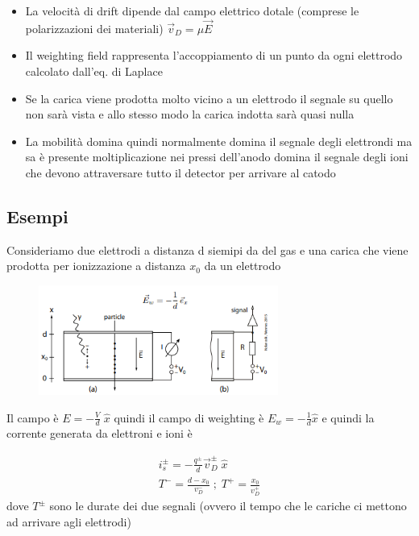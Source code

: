\begin{remark}
\begin{itemize}
    \item La velocità di drift dipende dal campo elettrico dotale (comprese le polarizzazioni dei materiali) $\vec{v}_D=\mu \vec{E}$
    \item Il weighting field rappresenta l'accoppiamento di un punto da ogni elettrodo calcolato dall'eq. di Laplace
    \item Se la carica viene prodotta molto vicino a un elettrodo il segnale su quello non sarà vista e allo stesso modo la carica indotta sarà quasi nulla
    \item La mobilità domina quindi normalmente domina il segnale degli elettrondi ma sa è presente moltiplicazione nei pressi dell'anodo domina il segnale degli ioni che devono attraversare tutto il detector per arrivare al catodo
\end{itemize}
\end{remark}

\subsection{Esempi}
Consideriamo due elettrodi a distanza d siemipi da del gas e una carica che viene prodotta per ionizzazione a distanza $x_0$ da un elettrodo
\begin{figure}[H]
    \centering
    \includegraphics[width=0.7\textwidth,frame]{Chapters/images/Interazione_radiazione_materia/image-20220223210231074.png}
\end{figure}
Il campo è $E=-\frac{V}{d} \;\hat{x}$ quindi il campo di weighting è $E_w=-\frac{1}{d}\hat{x}$ e quindi la corrente generata da elettroni e ioni è

\[
    \begin{gathered}
        i_s^\pm=-\frac{q^\pm}{d}\vec{v}_D^\pm \; \hat{x}
        \\ 
        T^-=\frac{d-x_0}{{v}_D^-} \; ; \; T^+=\frac{x_0}{{v}_D^+}
    \end{gathered}
\]
dove $T^\pm$ sono le durate dei due segnali (ovvero il tempo che le cariche ci mettono ad arrivare agli elettrodi)



